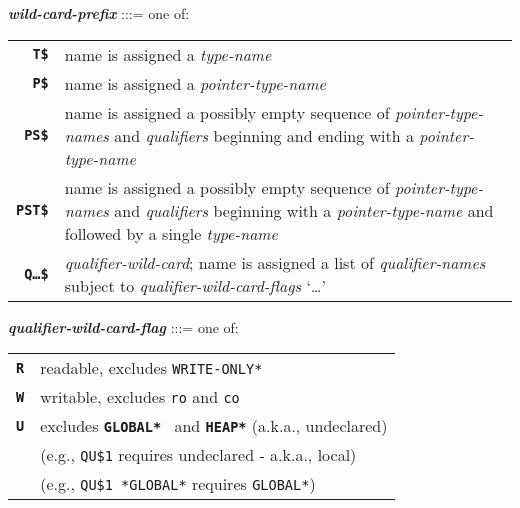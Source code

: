 \documentclass[12pt]{article}
\newcommand{\TT}[1]{{\tt \bfseries #1}}
\newcommand{\ttkey}[1]{{\tt \bfseries #1}}
\newcommand{\emkey}[1]{{\em \bfseries #1}}
\newenvironment{indpar}[1][0.3in]%
	{\begin{list}{}%
		     {\setlength{\itemsep}{0in}%
		      \setlength{\topsep}{0in}%
		      \setlength{\parsep}{1ex}%
		      \setlength{\labelwidth}{#1}%
		      \setlength{\leftmargin}{#1}%
		      \addtolength{\leftmargin}{\labelsep}}%
	 \item}%
	{\end{list}}
\begin{document}
\begin{indpar}
\emkey{wild-card-prefix}\label{WILD-CARD-PREFIX} :::= one of: \\
\hspace*{0.2in}\begin{tabular}{rp{4in}}
\ttkey{T\$} & name is assigned a {\em type-name} \\
\ttkey{P\$} & name is assigned a {\em pointer-type-name} \\
\ttkey{PS\$} & name is assigned a possibly empty
               sequence of {\em pointer-type-names}
	       and {\em qualifiers} beginning and ending with
	       a {\em pointer-type-name} \\
\ttkey{PST\$} & name is assigned a possibly empty
               sequence of {\em pointer-type-names}
	       and {\em qualifiers} beginning with
	       a {\em pointer-type-name} and followed by a single
	       {\em type-name} \\
\ttkey{Q\ldots\$} & {\em qualifier-wild-card}; name is assigned a
                    list of {\em qualifier-names} subject to
		    {\em qualifier-wild-card-flags} `\ldots'\\
\end{tabular}

\emkey{qualifier-wild-card-flag}\label{QUALIFIER-WILD-FLAG} :::= one of: \\
\hspace*{0.2in}\begin{tabular}{rl}
\ttkey{R} & readable, excludes {\tt *WRITE-ONLY*} \\
\ttkey{W} & writable, excludes {\tt ro} and {\tt co} \\
\ttkey{U} & excludes \TT{*GLOBAL*} ~and \TT{*HEAP*} (a.k.a., undeclared) \\
          & (e.g., {\tt QU\$1} requires undeclared - a.k.a., local) \\
          & (e.g., {\tt QU\$1 *GLOBAL*} requires {\tt *GLOBAL*}) \\
\end{tabular}
\end{indpar}
\end{document}
